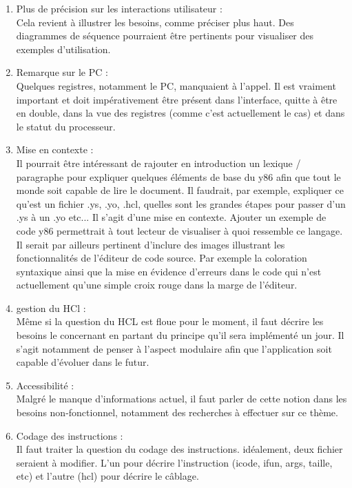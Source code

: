 \documentclass[french]{article}
\begin{document}
\begin{enumerate}
    \item Plus de précision sur les interactions utilisateur :\\
    Cela revient à illustrer les besoins, comme préciser plus haut. Des diagrammes de séquence pourraient être pertinents pour visualiser des exemples d'utilisation.
    \\
    \item Remarque sur le PC :\\
    Quelques registres, notamment le PC, manquaient à l'appel.  Il est vraiment important et doit impérativement être présent dans l'interface, quitte à être en double, dans la vue des registres (comme c'est actuellement le cas) et dans le statut du processeur.
    \\
    \item Mise en contexte :\\
    Il pourrait être intéressant de rajouter en introduction un lexique / paragraphe pour expliquer quelques éléments de base du y86 afin que tout le monde soit capable de lire le document. Il faudrait, par exemple, expliquer ce qu'est un fichier .ys, .yo, .hcl, quelles sont les grandes étapes pour passer d'un .ys à un .yo etc... Il s'agit d'une mise en contexte. Ajouter un exemple de code y86 permettrait à tout lecteur de visualiser à quoi ressemble ce langage. Il serait par ailleurs pertinent d'inclure des images illustrant les fonctionnalités de l'éditeur de code source. Par exemple la coloration syntaxique ainsi que la mise en évidence d'erreurs dans le code qui n'est actuellement qu'une simple croix rouge dans la marge de l'éditeur.
    \\
    \item gestion du HCl :\\
    Même si la question du HCL est floue pour le moment, il faut décrire les besoins le concernant en partant du principe qu'il sera implémenté un jour. Il s'agit notamment de penser à l'aspect modulaire afin que l'application soit capable d'évoluer dans le futur.
    \\
    \item Accessibilité :\\
    Malgré le manque d'informations actuel, il faut parler de cette notion dans les besoins non-fonctionnel, notamment des recherches à effectuer sur ce thème.
    \\
    \item Codage des instructions :\\
    Il faut traiter la question du codage des instructions. idéalement, deux fichier seraient à modifier. L'un pour décrire l'instruction (icode, ifun, args, taille, etc) et l'autre (hcl) pour décrire le câblage.\\

\end{enumerate}
\end{document}
